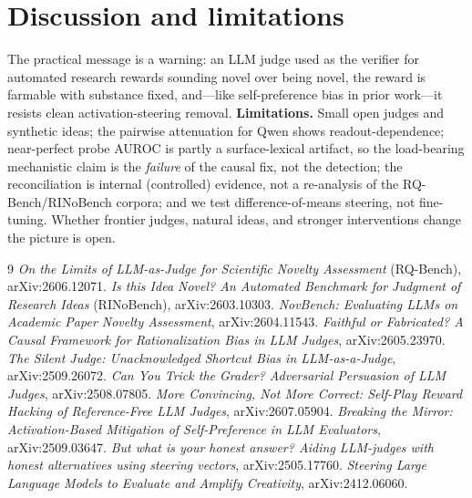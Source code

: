 \documentclass[11pt]{article}
\begin{document}
\section{Discussion and limitations}
The practical message is a warning: an LLM judge used as the verifier for
automated research rewards sounding novel over being novel, the reward is farmable
with substance fixed, and---like self-preference bias in prior work---it resists
clean activation-steering removal. \textbf{Limitations.} Small open judges and synthetic ideas; the
pairwise attenuation for Qwen shows readout-dependence; near-perfect probe AUROC
is partly a surface-lexical artifact, so the load-bearing mechanistic claim is the
\emph{failure} of the causal fix, not the detection; the reconciliation is
internal (controlled) evidence, not a re-analysis of the RQ-Bench/RINoBench
corpora; and we test difference-of-means steering, not fine-tuning. Whether
frontier judges, natural ideas, and stronger interventions change the picture is
open.


\begin{thebibliography}{9}
 \emph{On the Limits of LLM-as-Judge for Scientific Novelty Assessment} (RQ-Bench), arXiv:2606.12071.
 \emph{Is this Idea Novel? An Automated Benchmark for Judgment of Research Ideas} (RINoBench), arXiv:2603.10303.
 \emph{NovBench: Evaluating LLMs on Academic Paper Novelty Assessment}, arXiv:2604.11543.
 \emph{Faithful or Fabricated? A Causal Framework for Rationalization Bias in LLM Judges}, arXiv:2605.23970.
 \emph{The Silent Judge: Unacknowledged Shortcut Bias in LLM-as-a-Judge}, arXiv:2509.26072.
 \emph{Can You Trick the Grader? Adversarial Persuasion of LLM Judges}, arXiv:2508.07805.
 \emph{More Convincing, Not More Correct: Self-Play Reward Hacking of Reference-Free LLM Judges}, arXiv:2607.05904.
 \emph{Breaking the Mirror: Activation-Based Mitigation of Self-Preference in LLM Evaluators}, arXiv:2509.03647.
 \emph{But what is your honest answer? Aiding LLM-judges with honest alternatives using steering vectors}, arXiv:2505.17760.
 \emph{Steering Large Language Models to Evaluate and Amplify Creativity}, arXiv:2412.06060.
\end{thebibliography}
\end{document}
